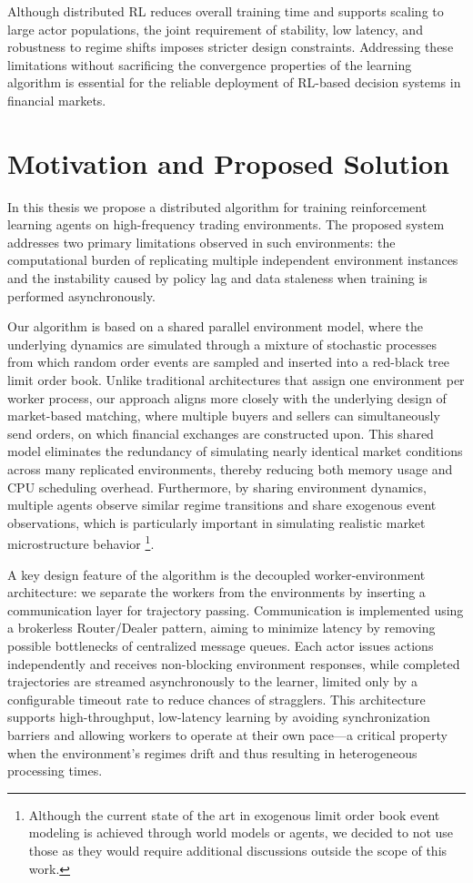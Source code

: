 Although distributed RL reduces overall training time and supports scaling to large actor populations,
the joint requirement of stability, low latency, and robustness to regime shifts imposes stricter design constraints.
Addressing these limitations without sacrificing the convergence properties of the learning algorithm is essential
for the reliable deployment of RL-based decision systems in financial markets.

\section{Motivation and Proposed Solution}
\label{sec:motivation}

In this thesis we propose a distributed algorithm for training reinforcement learning agents on high-frequency trading environments.
The proposed system addresses two primary limitations observed in such environments:
the computational burden of replicating multiple independent environment instances and the instability caused by
policy lag and data staleness when training is performed asynchronously.

Our algorithm is based on a shared parallel environment model, where the underlying dynamics are simulated
through a mixture of stochastic processes from which random order events are sampled and inserted into a red-black tree limit order book.
Unlike traditional architectures that assign one environment per worker process,
our approach aligns more closely with the underlying design of market-based matching,
where multiple buyers and sellers can simultaneously send orders, on which financial exchanges are constructed upon.
This shared model eliminates the redundancy of simulating nearly identical market conditions across many replicated environments,
thereby reducing both memory usage and CPU scheduling overhead.
Furthermore, by sharing environment dynamics, multiple agents observe similar regime transitions and share exogenous event observations,
which is particularly important in simulating realistic market microstructure behavior
\footnote{Although the current state of the art in exogenous limit order book event modeling is achieved through world models or agents,
we decided to not use those as they would require additional discussions outside the scope of this work.}.

A key design feature of the algorithm is the decoupled worker-environment architecture:
we separate the workers from the environments by inserting a communication layer for trajectory passing.
Communication is implemented using a brokerless Router/Dealer pattern, aiming to minimize latency by
removing possible bottlenecks of centralized message queues.
Each actor issues actions independently and receives non-blocking environment responses,
while completed trajectories are streamed asynchronously to the learner,
limited only by a configurable timeout rate to reduce chances of stragglers.
This architecture supports high-throughput, low-latency learning by avoiding synchronization barriers and
allowing workers to operate at their own pace---a critical property when the environment's regimes drift and
thus resulting in heterogeneous processing times.

